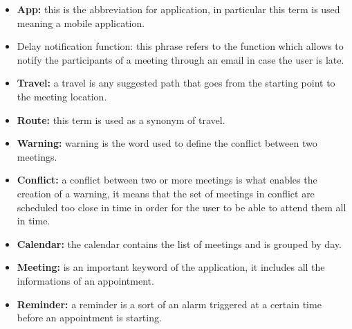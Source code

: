 \begin{itemize}

\item  \textbf{App:} this is the abbreviation for application, in particular this term is used meaning a mobile application.

\item  Delay notification function: this phrase refers to the function which allows to notify the participants of a meeting through an email in case the user is late.

\item  \textbf{Travel:} a travel is any suggested path that goes from the starting point to the meeting location.

\item  \textbf{Route:} this term is used as a synonym of travel.

\item  \textbf{Warning:} warning is the word used to define the conflict between two meetings.

\item  \textbf{Conflict:} a conflict between two or more meetings is what enables the creation of a warning, it means that the set of meetings in conflict are scheduled too close in time in order for the user to be able to attend them all in time.

\item  \textbf{Calendar:} the calendar contains the list of meetings and is grouped by day.

\item  \textbf{Meeting:} is an important keyword of the application, it includes all the informations of an appointment.

\item  \textbf{Reminder:} a reminder is a sort of an alarm triggered at a certain time before an appointment is starting.


\end{itemize}